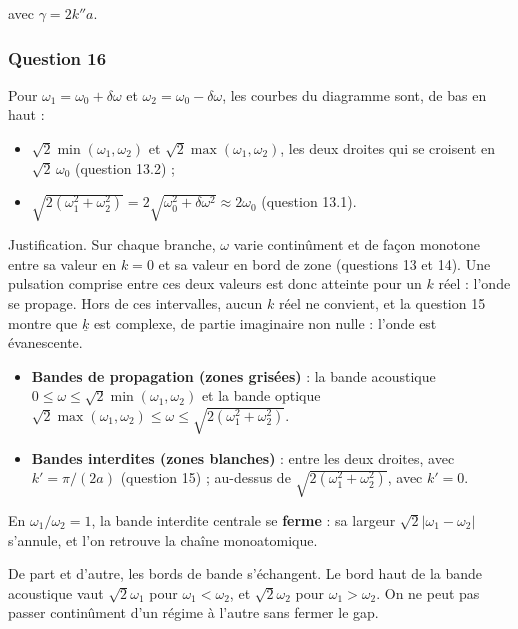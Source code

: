 \documentclass[11pt,a4paper]{article}
\providecommand{\tightlist}{\setlength{\itemsep}{0pt}\setlength{\parskip}{0pt}}
\renewcommand{\leq}{\leqslant}
\begin{document}
avec \(\gamma=2k''a\).

\hypertarget{question-16}{%
\subsubsection{Question 16}\label{question-16}}

Pour \(\omega_1=\omega_0+\delta\omega\) et \(\omega_2=\omega_0-\delta\omega\), les courbes du diagramme sont, de bas en haut :

\begin{itemize}
\tightlist
\item
  \(\sqrt2\min(\omega_1,\omega_2)\) et \(\sqrt2\max(\omega_1,\omega_2)\), les deux droites qui se croisent en \(\sqrt2\,\omega_0\) (question 13.2) ;
\item
  \(\sqrt{2(\omega_1^2+\omega_2^2)}=2\sqrt{\omega_0^2+\delta\omega^2}\approx2\omega_0\) (question 13.1).
\end{itemize}

Justification. Sur chaque branche, \(\omega\) varie continûment et de façon monotone entre sa valeur en \(k=0\) et sa valeur en bord de zone (questions 13 et 14). Une pulsation comprise entre ces deux valeurs est donc atteinte pour un \(k\) réel : l'onde se propage. Hors de ces intervalles, aucun \(k\) réel ne convient, et la question 15 montre que \(\underline k\) est complexe, de partie imaginaire non nulle : l'onde est évanescente.

\begin{itemize}
\tightlist
\item
  \textbf{Bandes de propagation (zones grisées)} : la bande acoustique \(0\leq\omega\leq\sqrt2\min(\omega_1,\omega_2)\) et la bande optique \(\sqrt2\max(\omega_1,\allowbreak \omega_2)\leq\omega\leq\sqrt{2(\omega_1^2+\omega_2^2)}\).
\item
  \textbf{Bandes interdites (zones blanches)} : entre les deux droites, avec \(k'=\pi/(2a)\) (question 15) ; au-dessus de \(\sqrt{2(\omega_1^2+\omega_2^2)}\), avec \(k'=0\).
\end{itemize}

En \(\omega_1/\omega_2=1\), la bande interdite centrale se \textbf{ferme} : sa largeur \(\sqrt2\lvert\omega_1-\omega_2\rvert\) s'annule, et l'on retrouve la chaîne monoatomique.

De part et d'autre, les bords de bande s'échangent. Le bord haut de la bande acoustique vaut \(\sqrt2\omega_1\) pour \(\omega_1<\omega_2\), et \(\sqrt2\omega_2\) pour \(\omega_1>\omega_2\). On ne peut pas passer continûment d'un régime à l'autre sans fermer le gap.
\end{document}
